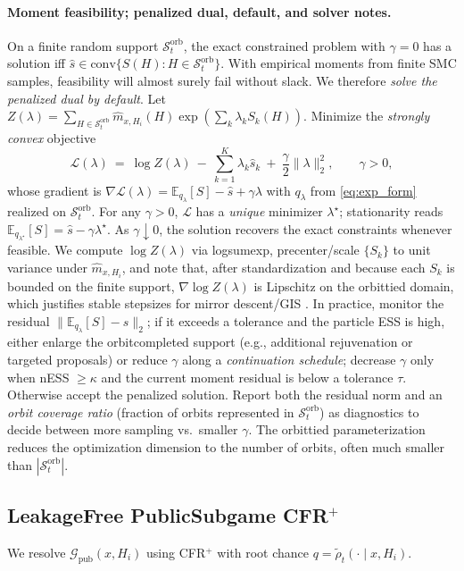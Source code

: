 \documentclass[10pt]{article}
\newcommand{\E}{\mathbb{E}}
\newcommand{\1}{\mathbf{1}}
\theoremstyle{plain}
\begin{document}
\paragraph{Moment feasibility; penalized dual, default, and solver notes.}
On a finite random support $\mathcal{S}_t^{\text{orb}}$, the exact constrained problem with $\gamma=0$ has a solution iff $\widehat s\in \mathrm{conv}\{S(H):H\in\mathcal{S}_t^{\text{orb}}\}$. With empirical moments from finite SMC samples, feasibility will almost surely fail without slack. We therefore \emph{solve the penalized dual by default}. Let $Z(\lambda)=\sum_{H\in\mathcal{S}_t^{\text{orb}}}\hat m_{x,H_i}(H)\exp(\sum_k \lambda_k S_k(H))$. Minimize the \emph{strongly convex} objective
\[
\mathcal{L}(\lambda)\ =\ \log Z(\lambda)\ -\ \sum_{k=1}^K \lambda_k \widehat s_k\ +\ \frac{\gamma}{2}\|\lambda\|_2^2,\qquad \gamma>0,
\]
whose gradient is $\nabla \mathcal{L}(\lambda)=\E_{q_\lambda}[S]-\widehat s+\gamma\lambda$ with $q_\lambda$ from \eqref{eq:exp_form} realized on $\mathcal{S}_t^{\text{orb}}$. For any $\gamma>0$, $\mathcal{L}$ has a \emph{unique} minimizer $\lambda^\star$; stationarity reads $\E_{q_{\lambda^\star}}[S]=\widehat s-\gamma\lambda^\star$. As $\gamma\downarrow 0$, the solution recovers the exact constraints whenever feasible. We compute $\log Z(\lambda)$ via log\textendash sum\textendash exp, pre\textendash center/scale $\{S_k\}$ to unit variance under $\hat m_{x,H_i}$, and note that, after standardization and because each $S_k$ is bounded on the finite support, $\nabla \log Z(\lambda)$ is Lipschitz on the orbit\textendash tied domain, which justifies stable stepsizes for mirror descent/GIS \citep{beck2003mirror,darroch1972gis}. In practice, monitor the residual $\| \E_{q_{\lambda}}[S]-\widehat s\|_2$; if it exceeds a tolerance and the particle ESS is high, either enlarge the orbit\textendash completed support (e.g., additional rejuvenation or targeted proposals) or reduce $\gamma$ along a \emph{continuation schedule}; decrease $\gamma$ only when nESS $\ge \kappa$ and the current moment residual is below a tolerance $\tau$. Otherwise accept the penalized solution. Report both the residual norm and an \emph{orbit coverage ratio} (fraction of orbits represented in $\mathcal{S}_t^{\text{orb}}$) as diagnostics to decide between more sampling vs.\ smaller $\gamma$. The orbit\textendash tied parameterization reduces the optimization dimension to the number of orbits, often much smaller than $|\mathcal{S}_t^{\text{orb}}|$.

\subsection{Leakage\textendash Free Public\textendash Subgame CFR$^+$}
\label{sec:lfps}
We re\textendash solve $\mathcal{G}_{\text{pub}}(x,H_i)$ using CFR$^+$ with root chance $q=\tilde\rho_t(\cdot\mid x,H_i)$.
\end{document}
